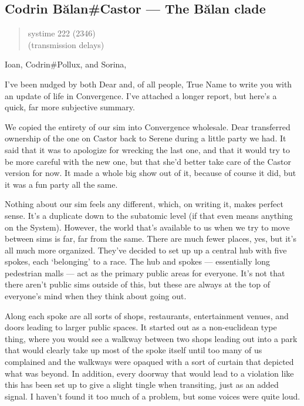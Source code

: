 \hypertarget{codrin-bux103lancastor-the-bux103lan-clade}{%
\subsection{Codrin Bălan\#Castor — The Bălan clade}\label{codrin-bux103lancastor-the-bux103lan-clade}}

\begin{quote}
systime 222 (2346)\\
(transmission delays)
\end{quote}

Ioan, Codrin\#Pollux, and Sorina,

I've been nudged by both Dear and, of all people, True Name to write you with an update of life in Convergence. I've attached a longer report, but here's a quick, far more subjective summary.

We copied the entirety of our sim into Convergence wholesale. Dear transferred ownership of the one on Castor back to Serene during a little party we had. It said that it was to apologize for wrecking the last one, and that it would try to be more careful with the new one, but that she'd better take care of the Castor version for now. It made a whole big show out of it, because of course it did, but it was a fun party all the same.

Nothing about our sim feels any different, which, on writing it, makes perfect sense. It's a duplicate down to the subatomic level (if that even means anything on the System). However, the world that's available to us when we try to move between sims is far, far from the same. There are much fewer places, yes, but it's all much more organized. They've decided to set up up a central hub with five spokes, each `belonging' to a race. The hub and spokes — essentially long pedestrian malls — act as the primary public areas for everyone. It's not that there aren't public sims outside of this, but these are always at the top of everyone's mind when they think about going out.

Along each spoke are all sorts of shops, restaurants, entertainment venues, and doors leading to larger public spaces. It started out as a non-euclidean type thing, where you would see a walkway between two shops leading out into a park that would clearly take up most of the spoke itself until too many of us complained and the walkways were opaqued with a sort of curtain that depicted what was beyond. In addition, every doorway that would lead to a violation like this has been set up to give a slight tingle when transiting, just as an added signal. I haven't found it too much of a problem, but some voices were quite loud.

